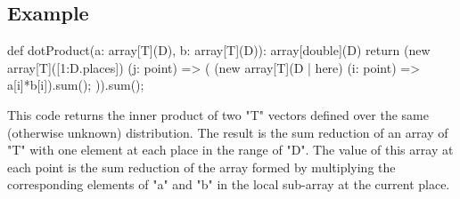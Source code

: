 \subsection{Example}
\begin{xten}
def dotProduct(a: array[T](D), b: array[T](D)): array[double](D) {
  return (new array[T]([1:D.places]) (j: point) => (
      (new array[T](D | here) (i: point) => a[i]*b[i]).sum();
  )).sum();
}
\end{xten}

This code returns the inner product of two \xcd"T" vectors defined
over the same (otherwise unknown) distribution. The result is the sum
reduction of an array of \xcd"T" with one element at each place in the
range of \xcd"D". The value of this array at each point is the sum
reduction of the array formed by multiplying the corresponding
elements of \xcd"a" and \xcd"b" in the local sub-array at the current
place.



